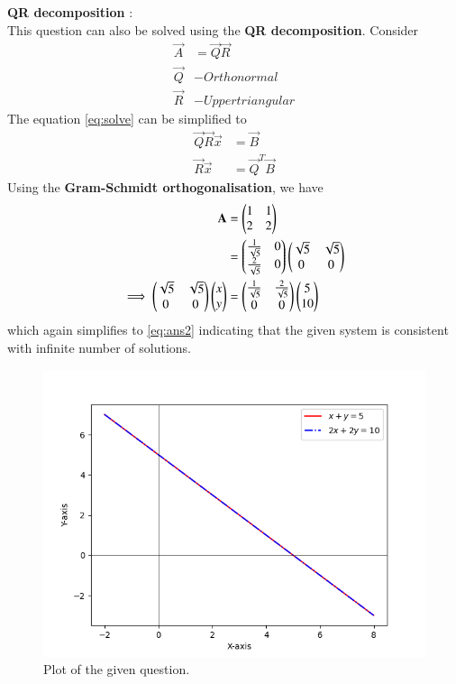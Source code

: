 \documentclass[journal]{IEEEtran}
\begin{document}
\textbf{QR decomposition} : \\
This question can also be solved using the \textbf{QR decomposition}. Consider
\begin{align}
	\vec{A} &= \vec{Q} \vec{R} \\
	\vec{Q} &- Orthonormal \\
	\vec{R} &- Upper triangular
\end{align}
The equation \eqref{eq:solve} can be simplified to
\begin{align}
	\vec{Q} \vec{R} \vec{x} &= \vec{B} \\
	\vec{R} \vec{x} &= \vec{Q}^{T} \vec{B}
\end{align}
Using the \textbf{Gram-Schmidt orthogonalisation}, we have
\begin{align}
	\mathbf{A} &= \begin{pmatrix}1 & 1 \\ 2 & 2\end{pmatrix} \\
		&= \begin{pmatrix}\frac{1}{\sqrt{5}} & 0 \\ \frac{2}{\sqrt{5}} & 0\end{pmatrix} \begin{pmatrix}\sqrt{5} & \sqrt{5} \\ 0 & 0\end{pmatrix} \\
	\implies \begin{pmatrix}\sqrt{5} & \sqrt{5} \\ 0 & 0\end{pmatrix} \begin{pmatrix}x \\ y\end{pmatrix} &= \begin{pmatrix}\frac{1}{\sqrt{5}} & \frac{2}{\sqrt{5}} \\ 0 & 0\end{pmatrix} \begin{pmatrix}5 \\ 10\end{pmatrix}
\end{align}
which again simplifies to \eqref{eq:ans2} indicating that the given system is consistent with infinite number of solutions.

\begin{figure}[h]
\centering
\includegraphics[width=\columnwidth]{figs/fig.png}
\caption{Plot of the given question.}
\label{fig:Plot1} 
\end{figure}
\end{document}
